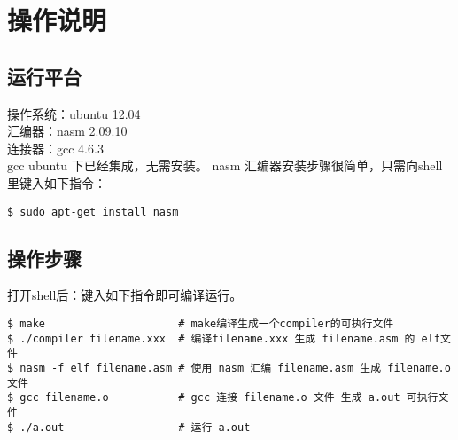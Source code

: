 \section{操作说明}
\subsection{运行平台}
操作系统：ubuntu 12.04 \\
汇编器：nasm 2.09.10 \\
连接器：gcc 4.6.3 \\
gcc ubuntu 下已经集成，无需安装。
nasm 汇编器安装步骤很简单，只需向shell里键入如下指令：
\begin{verbatim}
$ sudo apt-get install nasm
\end{verbatim}

\subsection{操作步骤}
打开shell后：键入如下指令即可编译运行。
\begin{verbatim}
$ make                     # make编译生成一个compiler的可执行文件
$ ./compiler filename.xxx  # 编译filename.xxx 生成 filename.asm 的 elf文件
$ nasm -f elf filename.asm # 使用 nasm 汇编 filename.asm 生成 filename.o 文件
$ gcc filename.o           # gcc 连接 filename.o 文件 生成 a.out 可执行文件
$ ./a.out                  # 运行 a.out 
\end{verbatim}

